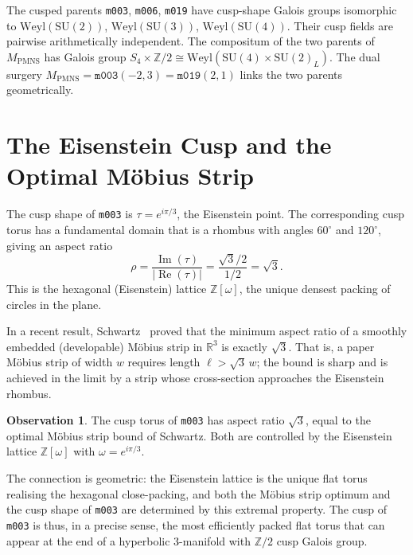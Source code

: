 \documentclass[11pt,a4paper]{article}
\theoremstyle{definition}
\newtheorem{observation}[theorem]{Observation}
\theoremstyle{remark}
\newcommand{\Z}{\mathbb{Z}}
\newcommand{\mfld}[1]{\texttt{#1}}
\newcommand{\SU}{\mathrm{SU}}
\newcommand{\Weyl}{\mathrm{Weyl}}
\begin{document}
The cusped parents \mfld{m003}, \mfld{m006}, \mfld{m019}
have cusp-shape Galois groups isomorphic to
$\Weyl(\SU(2))$, $\Weyl(\SU(3))$, $\Weyl(\SU(4))$.
Their cusp fields are pairwise arithmetically independent.
The compositum of the two parents of $M_{\mathrm{PMNS}}$
has Galois group $S_4\times\Z/2\cong\Weyl(\SU(4)\times\SU(2)_L)$.
The dual surgery $M_{\mathrm{PMNS}}=\mfld{m003}(-2,3)
=\mfld{m019}(2,1)$ links the two parents geometrically.

\section{The Eisenstein Cusp and the Optimal M\"obius Strip}

The cusp shape of \mfld{m003} is $\tau = e^{i\pi/3}$, the Eisenstein
point. The corresponding cusp torus has a fundamental domain that is
a rhombus with angles $60^\circ$ and $120^\circ$, giving an aspect ratio
\begin{equation}
\rho = \frac{\operatorname{Im}(\tau)}{|\operatorname{Re}(\tau)|}
= \frac{\sqrt{3}/2}{1/2} = \sqrt{3}.
\label{eq:aspect}
\end{equation}
This is the hexagonal (Eisenstein) lattice $\Z[\omega]$,
the unique densest packing of circles in the plane.

In a recent result, Schwartz~\cite{Schwartz} proved that the
minimum aspect ratio of a smoothly embedded (developable) M\"obius
strip in $\mathbb{R}^3$ is exactly $\sqrt{3}$.
That is, a paper M\"obius strip of width $w$ requires length
$\ell > \sqrt{3}\,w$; the bound is sharp and is achieved in the
limit by a strip whose cross-section approaches the Eisenstein rhombus.

\begin{observation}
The cusp torus of \mfld{m003} has aspect ratio $\sqrt{3}$,
equal to the optimal M\"obius strip bound of Schwartz.
Both are controlled by the Eisenstein lattice $\Z[\omega]$
with $\omega = e^{i\pi/3}$.
\end{observation}

The connection is geometric: the Eisenstein lattice is the unique
flat torus realising the hexagonal close-packing, and both the
M\"obius strip optimum and the cusp shape of \mfld{m003} are
determined by this extremal property.
The cusp of \mfld{m003} is thus, in a precise sense, the most
efficiently packed flat torus that can appear at the end of a
hyperbolic 3-manifold with $\Z/2$ cusp Galois group.
\end{document}
